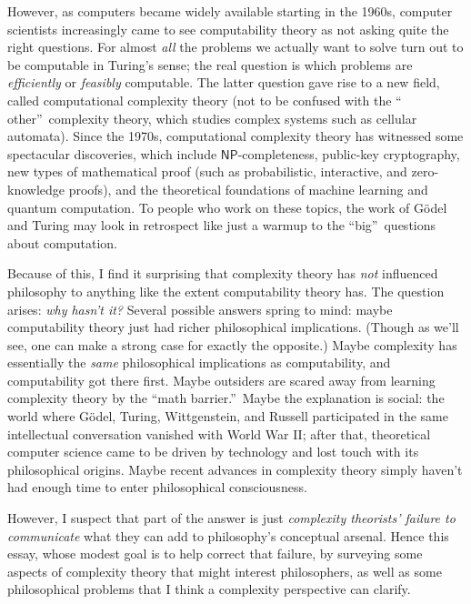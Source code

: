 \documentclass[12pt,onecolumn]{article}%
\begin{document}
However, as computers became widely available starting in the 1960s, computer
scientists increasingly came to see computability theory as not asking quite
the right questions. For almost \textit{all} the problems we actually want
to solve turn out to be computable in Turing's sense; the real question is
which problems are \textit{efficiently} or \textit{feasibly} computable.
The latter question gave rise to a new field, called computational
complexity theory (not to be confused with the \textquotedblleft
other\textquotedblright\  complexity theory, which studies complex systems such
as cellular automata). Since the 1970s, computational complexity theory has
witnessed some spectacular discoveries, which include $\mathsf{NP}%
$-completeness, public-key cryptography, new types of mathematical proof (such
as probabilistic, interactive, and zero-knowledge proofs), and the theoretical
foundations of machine learning and quantum computation. To people who work
on these topics, the work of G\"{o}del and Turing may look in retrospect like
just a warmup to the \textquotedblleft big\textquotedblright\  questions about computation.

Because of this, I find it surprising that complexity theory has \textit{not}
influenced philosophy to anything like the extent computability theory has.
 The question arises: \textit{why hasn't it?} Several possible answers
spring to mind: maybe computability theory just had richer philosophical
implications. (Though as we'll see, one can make a strong case for exactly
the opposite.) Maybe complexity has essentially the \textit{same}
philosophical implications as computability, and computability got there
first. Maybe outsiders are scared away from learning complexity theory by
the \textquotedblleft math barrier.\textquotedblright\  Maybe the explanation
is social: the world where G\"{o}del, Turing, Wittgenstein, and Russell
participated in the same intellectual conversation vanished with World War II;
after that, theoretical computer science came to be driven by technology and
lost touch with its philosophical origins. Maybe recent advances in
complexity theory simply haven't had enough time to enter philosophical consciousness.

However, I suspect that part of the answer is just \textit{complexity
theorists' failure to communicate} what they can add to philosophy's
conceptual arsenal. Hence this essay, whose modest goal is to help correct
that failure, by surveying some aspects of complexity theory that might
interest philosophers, as well as some philosophical problems that I think a
complexity perspective can clarify.
\end{document}
